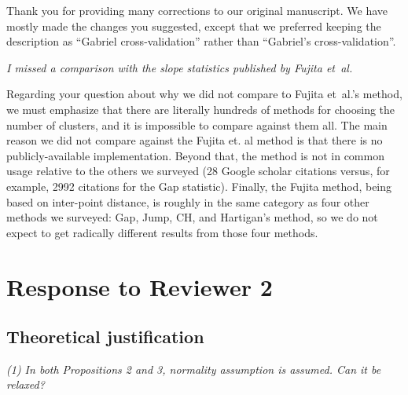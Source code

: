 \documentclass[11pt]{article}
\begin{document}
Thank you for providing many corrections to our original manuscript. We have
mostly made the changes you suggested, except that we preferred keeping the
description as ``Gabriel cross-validation'' rather than ``Gabriel's
cross-validation''.

\emph{I missed a comparison with the slope statistics published by Fujita
et~al.}

Regarding your question about why we did not compare to Fujita et~al.'s
method, we must emphasize that there are literally hundreds of methods for
choosing the number of clusters, and it is impossible to compare against them
all. The main reason we did not compare against the Fujita et. al method is
that there is no publicly-available implementation. Beyond that, the method is
not in common usage relative to the others we surveyed (28 Google scholar
citations versus, for example, 2992 citations for the Gap statistic). Finally,
the Fujita method, being based on inter-point distance, is roughly in the same
category as four other methods we surveyed: Gap, Jump, CH, and Hartigan's
method, so we do not expect to get radically different results from those four
methods.


\newpage

\section{Response to Reviewer 2}

\subsection{Theoretical justification}

\emph{(1) In both Propositions 2 and 3, normality assumption is assumed.
Can it be relaxed?}
\end{document}
